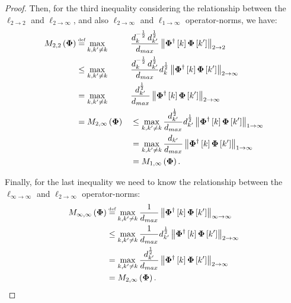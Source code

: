 \begin{proof}
Then, for the third inequality considering the relationship between the $\ell_{2 \to 2}$ and $\ell_{2 \to \infty}$, and also $\ell_{2 \to \infty}$ and $\ell_{1 \to \infty}$ operator-norms, we have:
\begin{equation*}
\begin{aligned}
M_{2,2}\myparanthese{\myPhi} 
&\myeq \max_{k,k' \neq k} &&\frac{d_{k}^{-\frac12} \, d_{k'}^{\frac12}}{d_{max}} \mynorm{\myPhi^\dagger\mybracket{k} \myPhi \mybracket{k'}}_{2 \to 2} \\
&\leq \max_{k,k' \neq k} &&\frac{d_{k}^{-\frac12} \, d_{k'}^{\frac12}}{d_{max}} d_{k}^{\frac12} \mynorm{\myPhi^\dagger\mybracket{k} \myPhi \mybracket{k'}}_{2 \to \infty} \\
&= \max_{k,k' \neq k} &&\frac{d_{k'}^{\frac12}}{d_{max}} \mynorm{\myPhi^\dagger\mybracket{k} \myPhi \mybracket{k'}}_{2 \to \infty} \\
&= M_{2 , \infty}\myparanthese{\myPhi} 
&&\leq \max_{k,k' \neq k} \frac{d_{k'}^{\frac12}}{d_{max}} d_{k'}^{\frac12} \mynorm{\myPhi^\dagger\mybracket{k} \myPhi \mybracket{k'}}_{1 \to \infty} \\
& &&= \max_{k,k' \neq k} \frac{d_{k'}}{d_{max}} \mynorm{\myPhi^\dagger\mybracket{k} \myPhi \mybracket{k'}}_{1 \to \infty} \\
& &&= M_{1,\infty}\myparanthese{\myPhi}.
\end{aligned}
\end{equation*}

Finally, for the last inequality we need to know the relationship between the $\ell_{\infty \to \infty}$ and $\ell_{2 \to \infty}$ operator-norms:
\begin{equation*}
\begin{aligned}
M_{\infty,\infty}\myparanthese{\myPhi} 
&\myeq \max_{k,k' \neq k} \frac{1}{d_{max}} \mynorm{\myPhi^\dagger\mybracket{k} \myPhi \mybracket{k'}}_{\infty \to \infty} \\
&\leq \max_{k,k' \neq k} \frac{1}{d_{max}} d_{k'}^{\frac12} \mynorm{\myPhi^\dagger\mybracket{k} \myPhi \mybracket{k'}}_{2 \to \infty} \\
&= \max_{k,k' \neq k} \frac{d_{k'}^{\frac12}}{d_{max}} \mynorm{\myPhi^\dagger\mybracket{k} \myPhi \mybracket{k'}}_{2 \to \infty} \\
&= M_{2 , \infty}\myparanthese{\myPhi}.
\end{aligned}
\end{equation*}


\end{proof}
